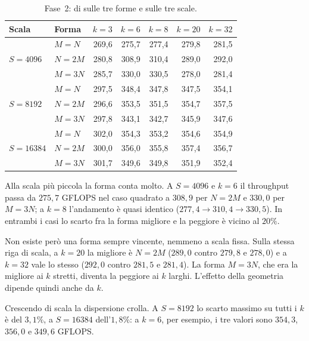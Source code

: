 \begin{table}[H]
\centering
\footnotesize
\caption{Fase~2:  di  sulle tre
forme e sulle tre scale.}
\label{tab:ris-fase2-warp}
\begin{tabular}{@{}llrrrrr@{}}
\toprule
\textbf{Scala} & \textbf{Forma}
& $k=3$ & $k=6$ & $k=8$ & $k=20$ & $k=32$ \\
\midrule

\multirow{3}{*}{$S=4096$}
& $M=N$  & 269,6 & 275,7 & 277,4 & 279,8 & 281,5 \\
& $N=2M$ & 280,8 & 308,9 & 310,4 & 289,0 & 292,0 \\
& $M=3N$ & 285,7 & 330,0 & 330,5 & 278,0 & 281,4 \\

\midrule

\multirow{3}{*}{$S=8192$}
& $M=N$  & 297,5 & 348,4 & 347,8 & 347,5 & 354,1 \\
& $N=2M$ & 296,6 & 353,5 & 351,5 & 354,7 & 357,5 \\
& $M=3N$ & 297,8 & 343,1 & 342,7 & 345,9 & 347,6 \\

\midrule

\multirow{3}{*}{$S=\num{16384}$}
& $M=N$  & 302,0 & 354,3 & 353,2 & 354,6 & 354,9 \\
& $N=2M$ & 300,0 & 356,0 & 355,8 & 357,4 & 356,7 \\
& $M=3N$ & 301,7 & 349,6 & 349,8 & 351,9 & 352,4 \\

\bottomrule
\end{tabular}
\end{table}

Alla scala più piccola la forma conta molto. A $S=4096$ e $k=6$ il throughput
passa da $275{,}7$ GFLOPS nel caso quadrato a $308{,}9$ per $N=2M$ e
$330{,}0$ per $M=3N$; a $k=8$ l'andamento è quasi identico
($277{,}4 \rightarrow 310{,}4 \rightarrow 330{,}5$). In entrambi i casi lo
scarto fra la forma migliore e la peggiore è vicino al $20\%$.

Non esiste però una forma sempre vincente, nemmeno a scala fissa. Sulla stessa
riga di scala, a $k=20$ la migliore è $N=2M$ ($289{,}0$ contro $279{,}8$ e
$278{,}0$) e a $k=32$ vale lo stesso ($292{,}0$ contro $281{,}5$ e $281{,}4$).
La forma $M=3N$, che era la migliore ai $k$ stretti, diventa la peggiore ai
$k$ larghi. L'effetto della geometria dipende quindi anche da $k$.

Crescendo di scala la dispersione crolla. A $S=8192$ lo scarto massimo su
tutti i $k$ è del $3{,}1\%$, a $S=\num{16384}$ dell'$1{,}8\%$: a $k=6$, per
esempio, i tre valori sono $354{,}3$, $356{,}0$ e $349{,}6$ GFLOPS.

